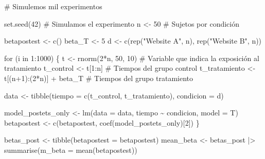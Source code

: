 \documentclass[
  letterpaper,
  DIV=11,
  numbers=noendperiod,
  oneside]{scrreprt}
\newenvironment{Shaded}{\begin{snugshade}}{\end{snugshade}}
\newcommand{\AttributeTok}[1]{\textcolor[rgb]{0.40,0.45,0.13}{#1}}
\newcommand{\CommentTok}[1]{\textcolor[rgb]{0.37,0.37,0.37}{#1}}
\newcommand{\ControlFlowTok}[1]{\textcolor[rgb]{0.00,0.23,0.31}{#1}}
\newcommand{\DecValTok}[1]{\textcolor[rgb]{0.68,0.00,0.00}{#1}}
\newcommand{\FunctionTok}[1]{\textcolor[rgb]{0.28,0.35,0.67}{#1}}
\newcommand{\NormalTok}[1]{\textcolor[rgb]{0.00,0.23,0.31}{#1}}
\newcommand{\OtherTok}[1]{\textcolor[rgb]{0.00,0.23,0.31}{#1}}
\newcommand{\SpecialCharTok}[1]{\textcolor[rgb]{0.37,0.37,0.37}{#1}}
\newcommand{\StringTok}[1]{\textcolor[rgb]{0.13,0.47,0.30}{#1}}
\begin{document}
\begin{Shaded}
\begin{Highlighting}[]
\CommentTok{\# Simulemos mil experimentos}

\FunctionTok{set.seed}\NormalTok{(}\DecValTok{42}\NormalTok{)}
\CommentTok{\# Simulamos el experimento}
\NormalTok{n }\OtherTok{\textless{}{-}} \DecValTok{50} \CommentTok{\# Sujetos por condición}

\NormalTok{betapostest }\OtherTok{\textless{}{-}} \FunctionTok{c}\NormalTok{()}
\NormalTok{beta\_T }\OtherTok{\textless{}{-}} \DecValTok{5}
\NormalTok{d }\OtherTok{\textless{}{-}} \FunctionTok{c}\NormalTok{(}\FunctionTok{rep}\NormalTok{(}\StringTok{"Website A"}\NormalTok{, n), }\FunctionTok{rep}\NormalTok{(}\StringTok{"Website B"}\NormalTok{, n))}

\ControlFlowTok{for}\NormalTok{ (i }\ControlFlowTok{in} \DecValTok{1}\SpecialCharTok{:}\DecValTok{1000}\NormalTok{) \{}
\NormalTok{  t }\OtherTok{\textless{}{-}} \FunctionTok{rnorm}\NormalTok{(}\DecValTok{2}\SpecialCharTok{*}\NormalTok{n, }\DecValTok{50}\NormalTok{, }\DecValTok{10}\NormalTok{) }\CommentTok{\# Variable que indica la exposición al tratamiento}
\NormalTok{  t\_control }\OtherTok{\textless{}{-}}\NormalTok{ t[}\DecValTok{1}\SpecialCharTok{:}\NormalTok{n] }\CommentTok{\# Tiempos del grupo control}
\NormalTok{  t\_tratamiento }\OtherTok{\textless{}{-}}\NormalTok{ t[(n}\SpecialCharTok{+}\DecValTok{1}\NormalTok{)}\SpecialCharTok{:}\NormalTok{(}\DecValTok{2}\SpecialCharTok{*}\NormalTok{n)] }\SpecialCharTok{+}\NormalTok{ beta\_T }\CommentTok{\# Tiempos del grupo tratamiento}
  
\NormalTok{  data }\OtherTok{\textless{}{-}} \FunctionTok{tibble}\NormalTok{(}\AttributeTok{tiempo =} \FunctionTok{c}\NormalTok{(t\_control, t\_tratamiento),}
                 \AttributeTok{condicion =}\NormalTok{ d)}
  
\NormalTok{  model\_postets\_only }\OtherTok{\textless{}{-}} \FunctionTok{lm}\NormalTok{(}\AttributeTok{data =}\NormalTok{ data, tiempo }\SpecialCharTok{\textasciitilde{}}\NormalTok{ condicion, }\AttributeTok{model =}\NormalTok{ T)}
\NormalTok{  betapostest }\OtherTok{\textless{}{-}} \FunctionTok{c}\NormalTok{(betapostest, }\FunctionTok{coef}\NormalTok{(model\_postets\_only)[}\DecValTok{2}\NormalTok{])}
\NormalTok{\}}

\NormalTok{betas\_post }\OtherTok{\textless{}{-}} \FunctionTok{tibble}\NormalTok{(}\AttributeTok{betapostest =}\NormalTok{ betapostest)}
\NormalTok{mean\_beta }\OtherTok{\textless{}{-}}\NormalTok{ betas\_post }\SpecialCharTok{|\textgreater{}}
  \FunctionTok{summarise}\NormalTok{(}\AttributeTok{m\_beta =} \FunctionTok{mean}\NormalTok{(betapostest))}


\end{Highlighting}
\end{Shaded}
\end{document}
